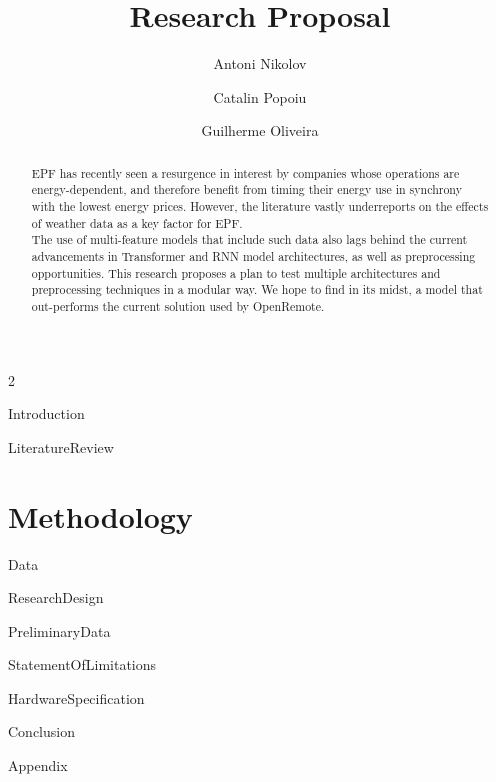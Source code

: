 \documentclass[print]{styledarticle}
\title{Research Proposal}
\author{Antoni Nikolov \and Catalin Popoiu \and Guilherme Oliveira}
\date{}
\begin{document}
\maketitle

\begin{multicols*}{2}
    \begin{abstract}
        EPF has recently seen a resurgence in interest by companies whose operations are energy-dependent, and therefore benefit from timing their energy use in synchrony with the lowest energy prices. However, the
        literature vastly underreports on the effects of weather data as a key factor for EPF.\\ The use of multi-feature models that include such data also lags behind the current advancements in Transformer and RNN model architectures,
        as well as preprocessing opportunities. This research proposes a plan to test multiple architectures and preprocessing techniques in a modular way.
        We hope to find in its midst, a model that out-performs the current solution used by OpenRemote.
    \end{abstract}

    {Introduction}

    {LiteratureReview}

    \section{Methodology}
        {Data}

        {ResearchDesign}

    {PreliminaryData}

    {StatementOfLimitations}

    {HardwareSpecification}

    {Conclusion}
\end{multicols*}




{Appendix}
\end{document}
